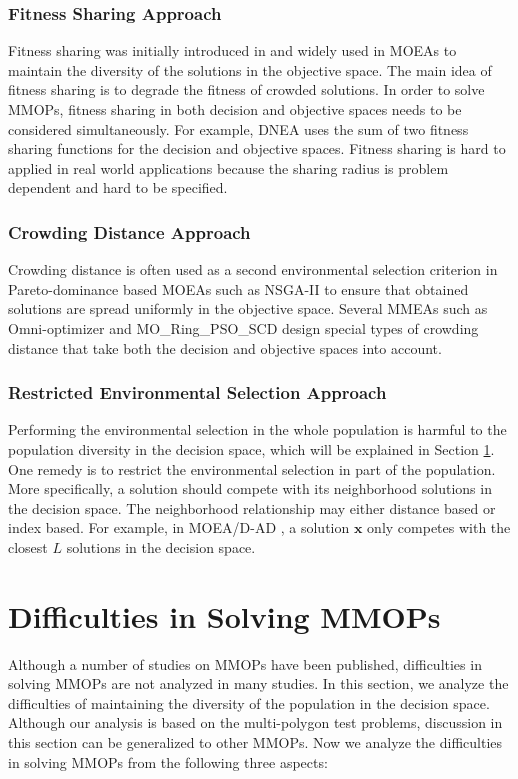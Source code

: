 \documentclass[conference]{IEEEtran}
\begin{document}
\subsubsection{Fitness Sharing Approach}
Fitness sharing was initially introduced in \cite{goldberg1987genetic} and widely used in MOEAs to maintain the diversity of the solutions in the objective space. The main idea of fitness sharing is to degrade the fitness of crowded solutions. In order to solve MMOPs, fitness sharing in both decision and objective spaces needs to be considered simultaneously. For example, DNEA\cite{liu2018double} uses the sum of two fitness sharing functions for the decision and objective spaces. Fitness sharing is hard to applied in real world applications because the sharing radius is problem dependent and hard to be specified.
\subsubsection{Crowding Distance Approach}
Crowding distance is often used as a second environmental selection criterion in Pareto-dominance based MOEAs such as NSGA-II\cite{deb2002fast} to ensure that obtained solutions are spread uniformly in the objective space. Several MMEAs such as Omni-optimizer\cite{deb2005omni} and MO\_Ring\_PSO\_SCD\cite{yue2017multiobjective} design special types of crowding distance that take both the decision and objective spaces into account.
\subsubsection{Restricted Environmental Selection Approach}
Performing the environmental selection in the whole population is harmful to the population diversity in the decision space, which will be explained in Section \ref{Difficulties Analysis}. One remedy is to restrict the environmental selection in part of the population. More specifically, a solution should compete with its neighborhood solutions in the decision space. The neighborhood relationship may either distance based or index based. For example, in MOEA/D-AD \cite{tanabe2018decomposition}, a solution $\boldsymbol{x}$ only competes with the closest $L$ solutions in the decision space.

\section{Difficulties in Solving MMOPs}
\label{Difficulties Analysis}
Although a number of studies on MMOPs have been published, difficulties in solving MMOPs are not analyzed in many studies. In this section, we analyze the difficulties of maintaining the diversity of the population in the decision space. Although our analysis is based on the multi-polygon test problems, discussion in this section can be generalized to other MMOPs. Now we analyze the difficulties in solving MMOPs from the following three aspects:
\end{document}
